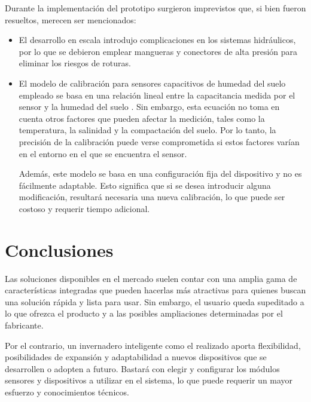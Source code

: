 Durante la implementación del prototipo surgieron imprevistos que, si bien fueron resueltos, merecen ser mencionados:
\begin{itemize}
\item El desarrollo en escala introdujo complicaciones en los sistemas hidráulicos, por lo que se debieron emplear mangueras y conectores de alta presión para eliminar los riesgos de roturas.

\item El modelo de calibración para sensores capacitivos de humedad del suelo empleado  se basa en una relación lineal entre la capacitancia medida por el sensor y la humedad del suelo \citep{soilcalibration}. Sin embargo, esta ecuación no toma en cuenta otros factores que pueden afectar la medición, tales como la temperatura, la salinidad y la compactación del suelo. Por lo tanto, la precisión de la calibración puede verse comprometida si estos factores varían en el entorno en el que se encuentra el sensor.

Además, este modelo se basa en una configuración fija del dispositivo y no es fácilmente adaptable. Esto significa que si se desea introducir alguna modificación, resultará necesaria una nueva calibración, lo que puede ser costoso y requerir tiempo adicional.
\end{itemize}


\section{Conclusiones}
Las soluciones disponibles en el mercado suelen contar con una amplia gama de características integradas que pueden hacerlas más atractivas para quienes buscan una solución rápida y lista para usar. Sin embargo, el usuario queda supeditado a lo que ofrezca el producto y a las posibles ampliaciones determinadas por el fabricante.

Por el contrario, un invernadero inteligente como el realizado aporta flexibilidad, posibilidades de expansión y adaptabilidad a nuevos dispositivos que se desarrollen o adopten a futuro. Bastará con elegir y configurar los módulos sensores y dispositivos a utilizar en el sistema, lo que puede requerir un mayor esfuerzo y conocimientos técnicos.








